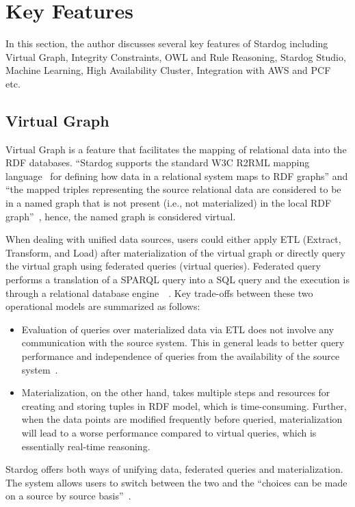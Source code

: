 \section{Key Features}
In this section, the author discusses several key features of Stardog 
including Virtual Graph, Integrity Constraints, OWL and Rule 
Reasoning, Stardog Studio, Machine Learning, 
High Availability Cluster, Integration with AWS and PCF etc.\

\subsection{Virtual Graph}
Virtual Graph is a feature that facilitates the mapping of relational data into 
the RDF databases. ``Stardog supports the standard W3C R2RML mapping 
language~\cite{hid-sp18-405-www-stardog-r2rml} for defining how data in a 
relational system maps to RDF graphs'' and ``the mapped triples 
representing the source relational data are considered to be in a named 
graph that is not present (i.e., not materialized) in the local RDF 
graph''~\cite{hid-sp18-405-blog-stardog-virtual}, hence, the named graph is 
considered virtual.

When dealing with unified data sources, users could either apply ETL 
(Extract, Transform, and Load) after materialization of the virtual graph or 
directly query the virtual graph using federated queries (virtual queries). 
Federated query performs a translation of a SPARQL query into a SQL query 
and the execution is through a relational database 
engine~\cite{hid-sp18-405-blog-stardog-virtual2}~\cite{hid-sp18-405-diego2017ontop-stardog}.
 Key trade-offs between these two operational models are summarized as 
 follows:
 \begin{itemize}
	\item Evaluation of queries over materialized data via ETL does not involve 
	any communication with the source system. This in general leads to better 
	query performance and independence of queries from the availability of 
	the source system~\cite{hid-sp18-405-blog-stardog-virtual}.
	\item Materialization, on the other hand, takes multiple steps and 
	resources for creating and storing tuples in RDF model, which is 
	time-consuming. Further, when the data points are modified frequently 
	before queried, materialization will lead to a worse performance compared 
	to virtual queries, which is essentially real-time reasoning.
\end{itemize}
Stardog offers both ways of unifying data, federated queries and 
materialization. The system allows users to switch between the two and the 
``choices can be made on a source by source 
basis''~\cite{hid-sp18-405-blog-stardog-virtual}.

